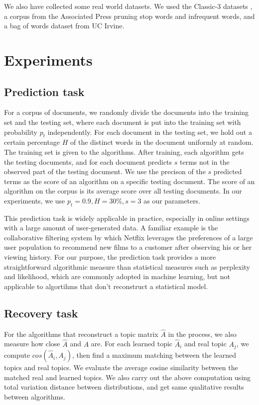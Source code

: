 \documentclass{article}
\begin{document}
We also have collected some real world datasets.  We used the
Classic-3 datasets \cite{Classic3}, a corpus from the Associated Press
\cite{AP} pruning stop words and infrequent words, and a bag of words
dataset from UC Irvine\cite{KosNIPS}.  


\section{Experiments}
\subsection{Prediction task}
For a corpus of documents, we randomly divide the documents into the training set and the testing set, where each document is put into the training set with probability $p_t$ independently. For each document in the testing set, we hold out a certain percentage $H$ of the distinct words in the document uniformly at random. The training set is given to the algorithms. After training, each algorithm gets the testing documents, and for each document predicts $s$ terms not in the observed part of the testing document. We use the precison of the $s$ predicted terms as the score of an algorithm on a specific testing document. The score of an algorithm on the corpus is its average score over all testing documents. In our experiments, we use $p_t=0.9, H=30\%,s=3$ as our parameters.

This prediction task is widely applicable in practice, especially in
online settings with a large amount of user-generated data. A familiar
example is the collaborative filtering system by which Netflix
leverages the preferences of a large user population to recommend new
films to a customer after observing his or her viewing history. For
our purpose, the prediction task provides a more straightforward
algorithmic measure than statistical measures such as perplexity and
likelihood, which are commonly adopted in machine learning, but not
applicable to algortihms that don't reconstruct a statistical model.

\subsection{Recovery task}
For the algorithms that reconstruct a topic matrix $\hat{A}$ in the
process, we also measure how close $\hat{A}$ and $A$ are. For each
learned topic $\hat{A}_i$ and real topic $A_j$, we compute
$cos(\hat{A}_i,A_j)$, then find a maximum matching between the learned
topics and real topics. We evaluate the average cosine similarity
between the matched real and learned topics. We also carry out the
above computation using total variation distance between
distributions, and get same qualitative results between algorithms.
\end{document}
